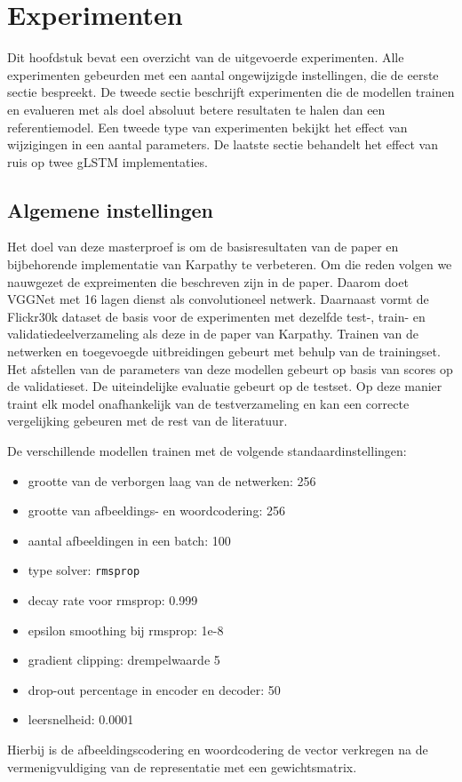 \chapter{Experimenten} %
\label{cha:experimenten}
Dit hoofdstuk bevat een overzicht van de uitgevoerde experimenten. Alle experimenten gebeurden met een aantal ongewijzigde instellingen, die de eerste sectie bespreekt. De tweede sectie beschrijft experimenten die de modellen trainen en evalueren met als doel absoluut betere resultaten te halen dan een referentiemodel. Een tweede type van experimenten bekijkt het effect van wijzigingen in een aantal parameters. De laatste sectie behandelt het effect van ruis op twee gLSTM implementaties.

\section{Algemene instellingen} %
\label{sec:eigen_implementaties_exp}
Het doel van deze masterproef is om de basisresultaten van de paper en bijbehorende implementatie van Karpathy\cite{Karpathy2015} te verbeteren. Om die reden volgen we nauwgezet de expreimenten die beschreven zijn in de paper. Daarom doet VGGNet met 16 lagen dienst als convolutioneel netwerk. Daarnaast vormt de Flickr30k dataset de basis voor de experimenten met dezelfde test-, train- en validatiedeelverzameling als deze in de paper van Karpathy. Trainen van de netwerken en toegevoegde uitbreidingen gebeurt met behulp van de trainingset. Het afstellen van de parameters van deze modellen gebeurt op basis van scores op de validatieset. De uiteindelijke evaluatie gebeurt op de testset. Op deze manier traint elk model onafhankelijk van de testverzameling en kan een correcte vergelijking gebeuren met de rest van de literatuur.

De verschillende modellen trainen met de volgende standaardinstellingen: 
\begin{itemize}
	\item grootte van de verborgen laag van de netwerken: 256
	\item grootte van afbeeldings- en woordcodering: 256
	\item aantal afbeeldingen in een batch: 100
	\item type solver: \texttt{rmsprop}
	\item decay rate voor rmsprop: 0.999
	\item epsilon smoothing bij rmsprop: 1e-8
	\item gradient clipping: drempelwaarde 5
	\item drop-out percentage in encoder en decoder: 50
	\item leersnelheid: 0.0001
\end{itemize}Hierbij is de afbeeldingscodering en woordcodering de vector verkregen na de vermenigvuldiging van de representatie met een gewichtsmatrix.

